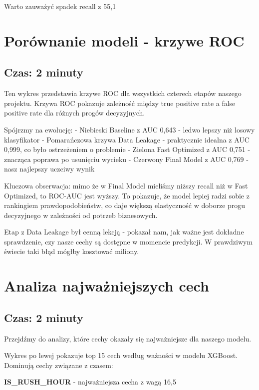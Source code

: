 \documentclass[12pt,a4paper]{article}
\begin{document}
Warto zauważyć spadek recall z 55,1%

\section{Porównanie modeli - krzywe ROC}
\subsection{Czas: 2 minuty}

Ten wykres przedstawia krzywe ROC dla wszystkich czterech etapów naszego projektu. Krzywa ROC pokazuje zależność między true positive rate a false positive rate dla różnych progów decyzyjnych.

Spójrzmy na ewolucję:
- Niebieski Baseline z AUC 0,643 - ledwo lepszy niż losowy klasyfikator
- Pomarańczowa krzywa Data Leakage - praktycznie idealna z AUC 0,999, co było ostrzeżeniem o problemie
- Zielona Fast Optimized z AUC 0,751 - znacząca poprawa po usunięciu wycieku
- Czerwony Final Model z AUC 0,769 - nasz najlepszy uczciwy wynik

Kluczowa obserwacja: mimo że w Final Model mieliśmy niższy recall niż w Fast Optimized, to ROC-AUC jest wyższy. To pokazuje, że model lepiej radzi sobie z rankingiem prawdopodobieństw, co daje większą elastyczność w doborze progu decyzyjnego w zależności od potrzeb biznesowych.

Etap z Data Leakage był cenną lekcją - pokazał nam, jak ważne jest dokładne sprawdzenie, czy nasze cechy są dostępne w momencie predykcji. W prawdziwym świecie taki błąd mógłby kosztować miliony.

\section{Analiza najważniejszych cech}
\subsection{Czas: 2 minuty}

Przejdźmy do analizy, które cechy okazały się najważniejsze dla naszego modelu.

Wykres po lewej pokazuje top 15 cech według ważności w modelu XGBoost. Dominują cechy związane z czasem:

\textbf{IS\_RUSH\_HOUR} - najważniejsza cecha z wagą 16,5%
\end{document}
